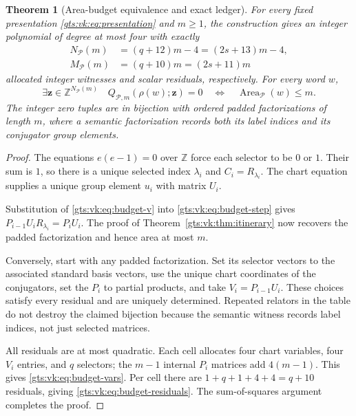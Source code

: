 \documentclass[11pt,letterpaper]{article}
\newtheorem{theorem}{Theorem}[section]
\theoremstyle{definition}
\theoremstyle{remark}
\newcommand{\Z}{\mathbb Z}
\newcommand{\Pp}{\mathcal P}
\newcommand{\Area}{\operatorname{Area}}
\begin{document}
\begin{theorem}[Area-budget equivalence and exact ledger]\label{gts:vk:thm:budget}
For every fixed presentation \eqref{gts:vk:eq:presentation} and $m\geq1$, the construction gives an integer polynomial of degree at most four with exactly
\begin{align}
 N_{\Pp}(m)&=(q+12)m-4=(2s+13)m-4,\label{gts:vk:eq:budget-vars}\\
 M_{\Pp}(m)&=(q+10)m=(2s+11)m\label{gts:vk:eq:budget-residuals}
\end{align}
allocated integer witnesses and scalar residuals, respectively. For every word $w$,
\begin{equation}\label{gts:vk:eq:budget-iff}
 \exists\boldsymbol z\in\Z^{N_{\Pp}(m)}\quad
 Q_{\Pp,m}(\rho(w);\boldsymbol z)=0
 \quad\Longleftrightarrow\quad \Area_{\Pp}(w)\leq m.
\end{equation}
The integer zero tuples are in bijection with ordered padded factorizations of length $m$, where a semantic factorization records both its label indices and its conjugator group elements.
\end{theorem}

\begin{proof}
The equations $e(e-1)=0$ over $\Z$ force each selector to be $0$ or $1$. Their sum is $1$, so there is a unique selected index $\lambda_i$ and $C_i=R_{\lambda_i}$. The chart equation supplies a unique group element $u_i$ with matrix $U_i$.

Substitution of \eqref{gts:vk:eq:budget-v} into \eqref{gts:vk:eq:budget-step} gives
$P_{i-1}U_iR_{\lambda_i}=P_iU_i$.
The proof of Theorem~\ref{gts:vk:thm:itinerary} now recovers the padded factorization and hence area at most $m$.

Conversely, start with any padded factorization. Set its selector vectors to the associated standard basis vectors, use the unique chart coordinates of the conjugators, set the $P_i$ to partial products, and take $V_i=P_{i-1}U_i$. These choices satisfy every residual and are uniquely determined. Repeated relators in the table do not destroy the claimed bijection because the semantic witness records label indices, not just selected matrices.

All residuals are at most quadratic. Each cell allocates four chart variables, four $V_i$ entries, and $q$ selectors; the $m-1$ internal $P_i$ matrices add $4(m-1)$. This gives \eqref{gts:vk:eq:budget-vars}. Per cell there are $1+q+1+4+4=q+10$ residuals, giving \eqref{gts:vk:eq:budget-residuals}. The sum-of-squares argument completes the proof.
\end{proof}
\end{document}
